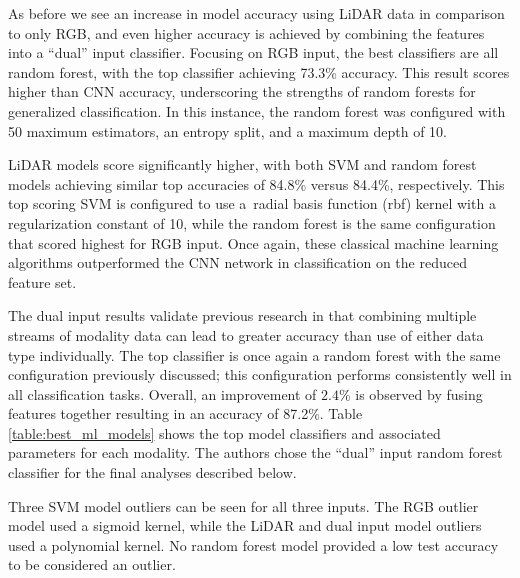 As before we see an increase in model accuracy using LiDAR data in comparison to only RGB, and even higher accuracy is achieved by combining the features into a ``dual'' input classifier.  Focusing on RGB input, the best classifiers are all random forest, with the top classifier achieving 73.3\% accuracy. This result scores higher than \ac{CNN} accuracy, underscoring the strengths of random forests for generalized classification. In this instance, the random forest was configured with 50 maximum estimators, an entropy split, and a maximum depth of 10.

LiDAR models score significantly higher, with both SVM and random forest models achieving similar top accuracies of 84.8\% versus  84.4\%, respectively. This top scoring SVM is configured to use a~radial basis function (rbf) kernel with a regularization constant of 10, while the random forest is the same configuration that scored highest for RGB input.  Once again, these classical machine learning algorithms outperformed the \ac{CNN} network in classification on the reduced feature set.

The dual input results validate previous research in that combining multiple streams of modality data can lead to greater accuracy than use of either data type individually. The top classifier is once again a random forest with the same configuration previously discussed; this configuration performs consistently well in all classification tasks. Overall, an improvement of $2.4$\% is observed by fusing features together resulting in an accuracy of 87.2\%.  Table \ref{table:best_ml_models} shows the top model classifiers and associated parameters for each modality. The authors chose the  ``dual'' input  random forest classifier for the final analyses  described below.

Three SVM model outliers can be seen for all three inputs. The RGB outlier model used a sigmoid kernel, while the LiDAR and dual input model outliers used a polynomial kernel. No random forest model provided a low test accuracy to be considered an outlier.

\begin{table}[H]
\centering
\caption{Best Classifiers using CNN extracted features.}\label{table:best_ml_models}
\end{table}


